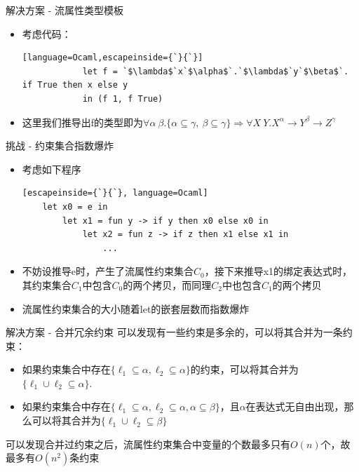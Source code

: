 \documentclass[9pt]{beamer}
\begin{document}
\begin{frame}[fragile]{解决方案 - 流属性类型模板}
	\begin{itemize}
		\item 考虑代码：
		\vspace{0.2em}
		\begin{lstlisting}[language=Ocaml,escapeinside={`}{`}]
			let f = `$\lambda$`x`$\alpha$`.`$\lambda$`y`$\beta$`. if True then x else y
			in (f 1, f True)
		\end{lstlisting}
		\vspace{0.3em}
		\item 这里我们推导出f的类型即为$\forall\alpha\ \beta.\{\alpha\subseteq\gamma,\ \beta\subseteq\gamma\}\Rightarrow\forall X\ Y.X^\alpha\to Y^\beta\to Z^\gamma$
	\end{itemize}
\end{frame}

\begin{frame}[fragile]{挑战 - 约束集合指数爆炸}
	\begin{itemize}
		\item 考虑如下程序
		\begin{lstlisting}[escapeinside={`}{`}, language=Ocaml]
	let x0 = e in
		let x1 = fun y -> if y then x0 else x0 in
			let x2 = fun z -> if z then x1 else x1 in
				...
		\end{lstlisting}
		\item 不妨设推导e时，产生了流属性约束集合$C_0$，接下来推导x1的绑定表达式时，其约束集合$C_1$中包含$C_0$的两个拷贝，而同理$C_2$中也包含$C_1$的两个拷贝
		\vspace{0.3em}
		\item 流属性约束集合的大小随着let的嵌套层数而指数爆炸
	\end{itemize}
\end{frame}

\begin{frame}[fragile]{解决方案 - 合并冗余约束}
	可以发现有一些约束是多余的，可以将其合并为一条约束：
	\vspace{0.5em}
	\begin{itemize}
				\item 如果约束集合中存在$\{\ell_1\subseteq \alpha, \ell_2\subseteq \alpha\}$的约束，可以将其合并为$\{\ell_1\cup\ell_2 \subseteq \alpha\}$. 
		\vspace{0.3em}
		\item 如果约束集合中存在$\{\ell_1 \subseteq \alpha, \ell_2 \subseteq \alpha, \alpha\subseteq \beta\}$，且$\alpha$在表达式无自由出现，那么可以将其合并为$\{\ell_1\cup\ell_2\subseteq\beta\}$
	\end{itemize}
	\vspace{0.5em}
	可以发现合并过约束之后，流属性约束集合中变量的个数最多只有$O(n)$个，故最多有$O(n^2)$条约束
\end{frame}
\end{document}
